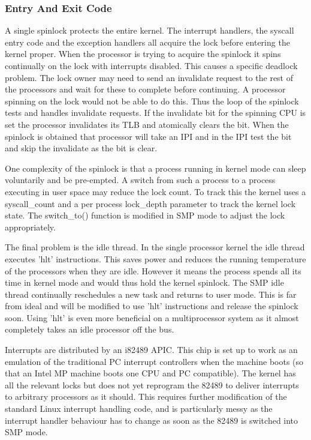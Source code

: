 \documentclass[]{article}
\begin{document}
\subsubsection{Entry And Exit Code}
A single spinlock protects the entire kernel. The interrupt handlers, the 
syscall entry code and the exception handlers all acquire the lock before 
entering the kernel proper. When the processor is trying to acquire the 
spinlock it spins continually on the lock with interrupts disabled. This 
causes a specific deadlock problem. The lock owner may need to send an 
invalidate request to the rest of the processors and wait for these to 
complete before continuing. A processor spinning on the lock would not be 
able to do this. Thus the loop of the spinlock tests and handles invalidate 
requests. If the invalidate bit for the spinning CPU is set the processor 
invalidates its TLB and atomically clears the bit. When the spinlock is 
obtained that processor will take an IPI and in the IPI test the bit and 
skip the invalidate as the bit is clear.

One complexity of the spinlock is that a process running in kernel mode 
can sleep voluntarily and be pre-empted. A switch from such a process to a 
process executing in user space may reduce the lock count. To track this 
the kernel uses a syscall\_count and a per process lock\_depth parameter to 
track the kernel lock state. The switch\_to() function is modified in SMP 
mode to adjust the lock appropriately.

The final problem is the idle thread. In the single processor kernel the 
idle thread executes 'hlt' instructions. This saves power and reduces the 
running temperature of the processors when they are idle. However it means 
the process spends all its time in kernel mode and would thus hold the 
kernel spinlock. The SMP idle thread continually reschedules a new task and 
returns to user mode. This is far from ideal and will be modified to use 
'hlt' instructions and release the spinlock soon. Using 'hlt' is even more 
beneficial on a multiprocessor system as it almost completely takes an idle 
processor off the bus.

Interrupts are distributed by an i82489 APIC. This chip is set up to work 
as an emulation of the traditional PC interrupt controllers when the 
machine boots (so that an Intel MP machine boots one CPU and PC 
compatible). The kernel has all the relevant locks but does not yet 
reprogram the 82489 to deliver interrupts to arbitrary processors as it 
should. This requires further modification of the standard Linux interrupt 
handling code, and is particularly messy as the interrupt handler behaviour 
has to change as soon as the 82489 is switched into SMP mode.
\end{document}

